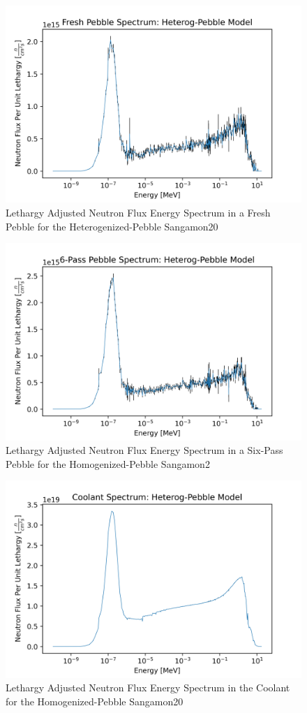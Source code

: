 \begin{figure}[H]
\centering

  \includegraphics[width=0.95\linewidth]{figures/fresh_spec_het}
  \caption{Lethargy Adjusted Neutron Flux Energy Spectrum in a Fresh Pebble for the Heterogenized-Pebble Sangamon20}
  \label{fig:het-fresh}

\end{figure}

\begin{figure}[H]
\centering

  \includegraphics[width=0.95\linewidth]{figures/6_spec_het}
  \caption{Lethargy Adjusted Neutron Flux Energy Spectrum in a Six-Pass Pebble for the Homogenized-Pebble Sangamon2}
  \label{fig:het-six}

\end{figure}

\begin{figure}[H]
\centering

  \includegraphics[width=0.95\linewidth]{figures/cool_spec_het}
  \caption{Lethargy Adjusted Neutron Flux Energy Spectrum in the Coolant for the Homogenized-Pebble Sangamon20}
  \label{fig:het-cool}

\end{figure}